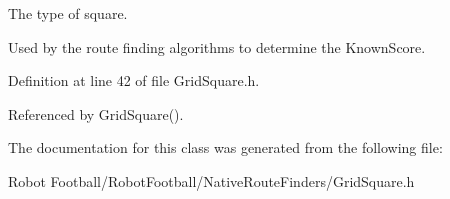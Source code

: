 The type of square. 

Used by the route finding algorithms to determine the Known\-Score. 

Definition at line 42 of file Grid\-Square.h.

Referenced by Grid\-Square().

The documentation for this class was generated from the following file:\begin{CompactItemize}
\item 
Robot Football/Robot\-Football/Native\-Route\-Finders/Grid\-Square.h\end{CompactItemize}
